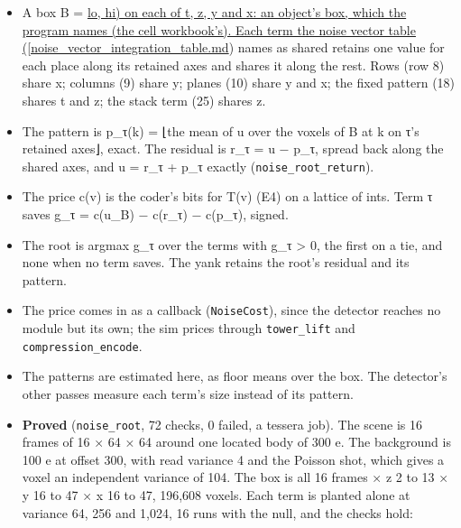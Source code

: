 \begin{itemize}
\item A box B = \hyperref[chap:noise-vector-integration-table]{lo, hi) on each of t, z, y and x: an object's box, which the program names (the cell workbook's). Each term the noise vector table ([noise\_\allowbreak{}vector\_\allowbreak{}integration\_\allowbreak{}table.md}) names as shared retains one value for each place along its retained axes and shares it along the rest. Rows (row 8) share x; columns (9) share y; planes (10) share y and x; the fixed pattern (18) shares t and z; the stack term (25) shares z.
\item The pattern is p\_\allowbreak{}τ(k) = ⌊the mean of u over the voxels of B at k on τ's retained axes⌋, exact. The residual is r\_\allowbreak{}τ = u − p\_\allowbreak{}τ, spread back along the shared axes, and u = r\_\allowbreak{}τ + p\_\allowbreak{}τ exactly (\texttt{noise\_\allowbreak{}root\_\allowbreak{}return}).
\item The price c(v) is the coder's bits for T(v) (E4) on a lattice of ints. Term τ saves g\_\allowbreak{}τ = c(u\_\allowbreak{}B) − c(r\_\allowbreak{}τ) − c(p\_\allowbreak{}τ), signed.
\item The root is argmax g\_\allowbreak{}τ over the terms with g\_\allowbreak{}τ > 0, the first on a tie, and none when no term saves. The yank retains the root's residual and its pattern.
\item The price comes in as a callback (\texttt{Noise\allowbreak{}Cost}), since the detector reaches no module but its own; the sim prices through \texttt{tower\_\allowbreak{}lift} and \texttt{compression\_\allowbreak{}encode}.
\item The patterns are estimated here, as floor means over the box. The detector's other passes measure each term's size instead of its pattern.
\item \textbf{Proved} (\texttt{noise\_\allowbreak{}root}, 72 checks, 0 failed, a tessera job). The scene is 16 frames of 16 × 64 × 64 around one located body of 300 e. The background is 100 e at offset 300, with read variance 4 and the Poisson shot, which gives a voxel an independent variance of 104. The box is all 16 frames × z 2 to 13 × y 16 to 47 × x 16 to 47, 196,608 voxels. Each term is planted alone at variance 64, 256 and 1,024, 16 runs with the null, and the checks hold:


\end{itemize}
